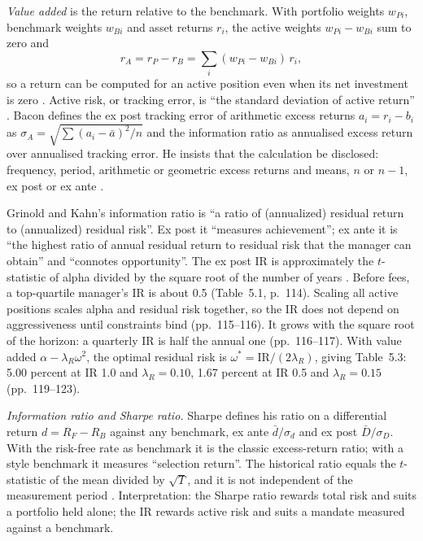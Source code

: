 \begin{qfmethod}\label{meth:active-return-information-ratio}
 \emph{Value added} is the return relative to the benchmark. With portfolio weights $w_{Pi}$, benchmark weights $w_{Bi}$ and asset returns $r_i$, the active weights $w_{Pi}-w_{Bi}$ sum to zero and
\[ r_A=r_P-r_B=\sum_i(w_{Pi}-w_{Bi})\,r_i, \]
so a return can be computed for an active position even when its net investment is zero \citep[chap.~12 (Bailey, Richards and Tierney), p.~743, eq.~(12-9)]{managing-investment-portfolios-2007}. Active risk, or tracking error, is ``the standard deviation of active return'' \citep[chap.~3, p.~49]{alpha-grinold}. Bacon defines the ex post tracking error of arithmetic excess returns $a_i=r_i-b_i$ as $\sigma_A=\sqrt{\sum(a_i-\bar a)^2/n}$ and the information ratio as annualised excess return over annualised tracking error. He insists that the calculation be disclosed: frequency, period, arithmetic or geometric excess returns and means, $n$ or $n-1$, ex post or ex ante \citep[3rd ed., 2023, chap.~5, pp.~167--169, eqs.~(5.27)--(5.29)]{wide-bacon-attribution}.

Grinold and Kahn's information ratio is ``a ratio of (annualized) residual return to (annualized) residual risk''. Ex post it ``measures achievement''; ex ante it is ``the highest ratio of annual residual return to residual risk that the manager can obtain'' and ``connotes opportunity''. The ex post IR is approximately the $t$-statistic of alpha divided by the square root of the number of years \citep[chap.~5, pp.~110--113]{alpha-grinold}. Before fees, a top-quartile manager's IR is about 0.5 (Table~5.1, p.~114). Scaling all active positions scales alpha and residual risk together, so the IR does not depend on aggressiveness until constraints bind (pp.~115--116). It grows with the square root of the horizon: a quarterly IR is half the annual one (pp.~116--117). With value added $\alpha-\lambda_R\omega^2$, the optimal residual risk is $\omega^*=\text{IR}/(2\lambda_R)$, giving Table~5.3: 5.00 percent at IR 1.0 and $\lambda_R=0.10$, 1.67 percent at IR 0.5 and $\lambda_R=0.15$ (pp.~119--123).

\emph{Information ratio and Sharpe ratio.} Sharpe defines his ratio on a differential return $d=R_F-R_B$ against any benchmark, ex ante $\bar d/\sigma_d$ and ex post $\bar D/\sigma_D$. With the risk-free rate as benchmark it is the classic excess-return ratio; with a style benchmark it measures ``selection return''. The historical ratio equals the $t$-statistic of the mean divided by $\sqrt T$, and it is not independent of the measurement period \citep[sections ``The Ex Ante Sharpe Ratio'', ``The Ex Post Sharpe Ratio'' and ``Time Dependence'']{wide-sharpe-1994}. Interpretation: the Sharpe ratio rewards total risk and suits a portfolio held alone; the IR rewards active risk and suits a mandate measured against a benchmark.


\end{qfmethod}
